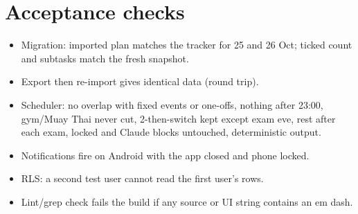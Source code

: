 \documentclass[11pt,a4paper]{article}
\begin{document}
\section{Acceptance checks}\label{sec:accept}

\begin{itemize}[label=$\square$]
  \item Migration: imported plan matches the tracker for 25 and 26 Oct; ticked count and subtasks match the fresh snapshot.
  \item Export then re-import gives identical data (round trip).
  \item Scheduler: no overlap with fixed events or one-offs, nothing after 23:00, gym/Muay Thai never cut, 2-then-switch kept except exam eve, rest after each exam, locked and Claude blocks untouched, deterministic output.
  \item Notifications fire on Android with the app closed and phone locked.
  \item RLS: a second test user cannot read the first user's rows.
  \item Lint/grep check fails the build if any source or UI string contains an em dash.
\end{itemize}
\end{document}
